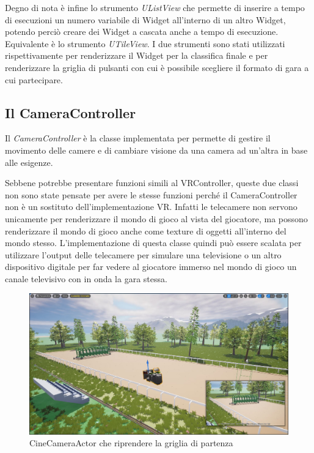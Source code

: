     Degno di nota è infine lo strumento \textit{UListView} che permette di inserire a tempo di esecuzioni un numero variabile di Widget all'interno di un altro Widget, potendo perciò creare dei Widget a cascata anche a tempo di esecuzione.
    Equivalente è lo strumento \textit{UTileView}.
    I due strumenti sono stati utilizzati rispettivamente per renderizzare il Widget per la classifica finale e per renderizzare la griglia di pulsanti con cui è possibile scegliere il formato di gara a cui partecipare.

    \subsection{Il {CameraController}}

    Il \textit{CameraController} è la classe implementata per permette di gestire il movimento delle camere e di cambiare visione da una camera ad un'altra in base alle esigenze.
    
    Sebbene potrebbe presentare funzioni simili al VRController, queste due classi non sono state pensate per avere le stesse funzioni perché il CameraController non è un sostituto dell'implementazione VR.
    Infatti le telecamere non servono unicamente per renderizzare il mondo di gioco al vista del giocatore, ma possono renderizzare il mondo di gioco anche come texture di oggetti all'interno del mondo stesso.
    L'implementazione di questa classe quindi può essere scalata per utilizzare l'output delle telecamere per simulare una televisione o un altro dispositivo digitale per far vedere al giocatore immerso nel mondo di gioco un canale televisivo con in onda la gara stessa.

    \begin{figure}[!ht]\label{img:CineCameraActor}
        \centering
        \includegraphics[width=12cm]{figure/CameraActor.JPG}
        \caption{CineCameraActor che riprendere la griglia di partenza}
    \end{figure}

